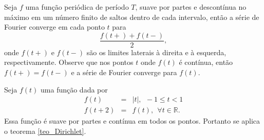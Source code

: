 \begin{teo}{\label{teo_Dirichlet}} Seja $f$ uma função periódica de período $T$, suave por partes e descontínua no máximo em um número finito de saltos dentro de cada intervalo, então a série de Fourier converge em cada ponto $t$ para
$$
\frac{f(t+)+f(t-)}{2},
$$
onde $f(t+)$ e $f(t-)$ são os limites laterais à direita e à esquerda, respectivamente. Observe que nos pontos $t$ onde $f(t)$ é contínua, então $f(t+)=f(t-)$ e a série de Fourier converge para $f(t)$.
\end{teo}
\begin{ex}\label{ex_triangular} Seja $f(t)$ uma função dada por
\begin{eqnarray*}
f(t)&=&|t|, \ \ -1\leq t<1\\
f(t+2)&=&f(t),\ \ \forall t\in\mathbb{R}.
\end{eqnarray*}
Essa função é suave por partes e contínua em todos os pontos. Portanto se aplica o teorema \ref{teo_Dirichlet}.
\begin{center}


\end{center}
\end{ex}
